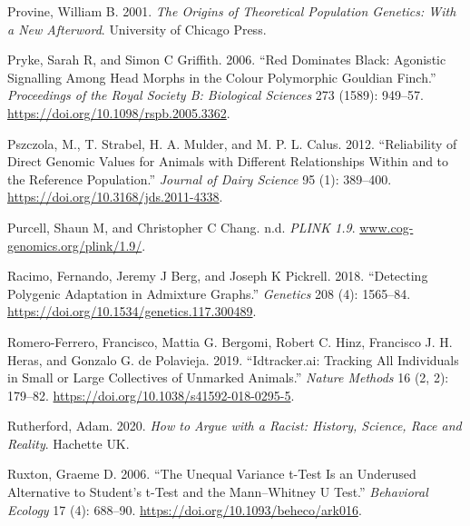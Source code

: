 \documentclass[
]{book}
\newlength{\cslhangindent}
\newlength{\cslentryspacingunit} %
\newenvironment{CSLReferences}[2] %
 {%
  \setlength{\parindent}{0pt}
  \ifodd #1
  \let\oldpar\par
  \def\par{\hangindent=\cslhangindent\oldpar}
  \fi
  \setlength{\parskip}{#2\cslentryspacingunit}
 }%
 {}
\begin{document}
\begin{CSLReferences}{1}{0}
\leavevmode{}%
Provine, William B. 2001. \emph{The Origins of Theoretical Population Genetics: With a New Afterword}. {University of Chicago Press}.

\leavevmode{}%
Pryke, Sarah R, and Simon C Griffith. 2006. {``Red Dominates Black: Agonistic Signalling Among Head Morphs in the Colour Polymorphic {Gouldian} Finch.''} \emph{Proceedings of the Royal Society B: Biological Sciences} 273 (1589): 949--57. \url{https://doi.org/10.1098/rspb.2005.3362}.

\leavevmode{}%
Pszczola, M., T. Strabel, H. A. Mulder, and M. P. L. Calus. 2012. {``Reliability of Direct Genomic Values for Animals with Different Relationships Within and to the Reference Population.''} \emph{Journal of Dairy Science} 95 (1): 389--400. \url{https://doi.org/10.3168/jds.2011-4338}.

\leavevmode{}%
Purcell, Shaun M, and Christopher C Chang. n.d. \emph{{PLINK} 1.9}. \href{https://www.cog-genomics.org/plink/1.9/}{www.cog-genomics.org/plink/1.9/}.

\leavevmode{}%
Racimo, Fernando, Jeremy J Berg, and Joseph K Pickrell. 2018. {``Detecting {Polygenic Adaptation} in {Admixture Graphs}.''} \emph{Genetics} 208 (4): 1565--84. \url{https://doi.org/10.1534/genetics.117.300489}.

\leavevmode{}%
Romero-Ferrero, Francisco, Mattia G. Bergomi, Robert C. Hinz, Francisco J. H. Heras, and Gonzalo G. de Polavieja. 2019. {``Idtracker.ai: Tracking All Individuals in Small or Large Collectives of Unmarked Animals.''} \emph{Nature Methods} 16 (2, 2): 179--82. \url{https://doi.org/10.1038/s41592-018-0295-5}.

\leavevmode{}%
Rutherford, Adam. 2020. \emph{How to Argue with a Racist: {History}, Science, Race and Reality}. {Hachette UK}.

\leavevmode{}%
Ruxton, Graeme D. 2006. {``The Unequal Variance t-Test Is an Underused Alternative to {Student}'s t-Test and the {Mann}--{Whitney U} Test.''} \emph{Behavioral Ecology} 17 (4): 688--90. \url{https://doi.org/10.1093/beheco/ark016}.


\end{CSLReferences}
\end{document}
